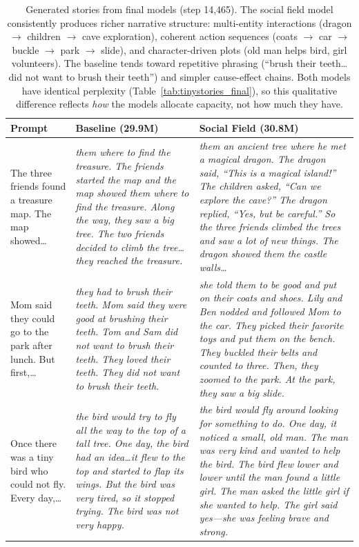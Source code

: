 \documentclass[11pt,a4paper]{article}
\begin{document}
\begin{table}[h]
\centering
\small
\begin{tabular}{@{}p{1.8cm}p{5.8cm}p{5.8cm}@{}}
\toprule
\textbf{Prompt} & \textbf{Baseline (29.9M)} & \textbf{Social Field (30.8M)} \\
\midrule
The three friends found a treasure map. The map showed\ldots
&
\emph{them where to find the treasure. The friends started
the map and the map showed them where to find the treasure.
Along the way, they saw a big tree. The two friends decided
to climb the tree\ldots they reached the treasure.}
&
\emph{them an ancient tree where he met a magical dragon.
The dragon said, ``This is a magical island!'' The children
asked, ``Can we explore the cave?'' The dragon replied,
``Yes, but be careful.'' So the three friends climbed the
trees and saw a lot of new things. The dragon showed them
the castle walls\ldots}
\\[6pt]
Mom said they could go to the park after lunch. But first,\ldots
&
\emph{they had to brush their teeth. Mom said they were good
at brushing their teeth. Tom and Sam did not want to brush
their teeth. They loved their teeth. They did not want to
brush their teeth.}
&
\emph{she told them to be good and put on their coats and
shoes. Lily and Ben nodded and followed Mom to the car.
They picked their favorite toys and put them on the bench.
They buckled their belts and counted to three. Then, they
zoomed to the park. At the park, they saw a big slide.}
\\[6pt]
Once there was a tiny bird who could not fly. Every day,\ldots
&
\emph{the bird would try to fly all the way to the top of
a tall tree. One day, the bird had an idea\ldots it flew to
the top and started to flap its wings. But the bird was very
tired, so it stopped trying. The bird was not very happy.}
&
\emph{the bird would fly around looking for something to do.
One day, it noticed a small, old man. The man was very kind
and wanted to help the bird. The bird flew lower and lower
until the man found a little girl. The man asked the little
girl if she wanted to help. The girl said yes---she was
feeling brave and strong.}
\\
\bottomrule
\end{tabular}
\caption{Generated stories from final models (step 14,465).  The social
field model consistently produces richer narrative structure:
multi-entity interactions (dragon $\rightarrow$ children $\rightarrow$
cave exploration), coherent action sequences (coats $\rightarrow$ car
$\rightarrow$ buckle $\rightarrow$ park $\rightarrow$ slide), and
character-driven plots (old man helps bird, girl volunteers).  The
baseline tends toward repetitive phrasing (``brush their teeth\ldots
did not want to brush their teeth'') and simpler cause-effect chains.
Both models have identical perplexity (Table~\ref{tab:tinystories_final}),
so this qualitative difference reflects \emph{how} the models allocate
capacity, not how much they have.}
\label{tab:stories}
\end{table}
\end{document}
